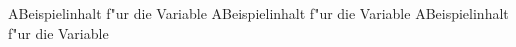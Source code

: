 \nomenclature[aA]A{Beispielinhalt f"ur die Variable}
\nomenclature[xA]A{Beispielinhalt f"ur die Variable}
\nomenclature[zA]A{Beispielinhalt f"ur die Variable}

